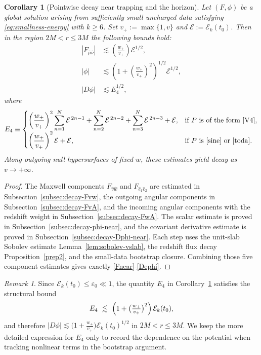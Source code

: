 \documentclass[11pt]{article}
\numberwithin{equation}{section}
\theoremstyle{plain}
\newtheorem{corollary}[theorem]{Corollary}
\theoremstyle{definition}
\theoremstyle{remark}
\newtheorem{remark}{Remark}[section]
\newcommand{\vplus}{v_{+}}
\newcommand{\wplus}{w_{+}}
\begin{document}
\begin{corollary}[Pointwise decay near trapping and the horizon]\label{cor:near-horizon}
Let $(F,\phi)$ be a global solution arising from sufficiently small uncharged data satisfying \eqref{eq:smallness-energy} with $k\ge 6$.
Set $\vplus:=\max\{1,v\}$ and $\mathcal{E}:=\mathcal{E}_k(t_0)$.
Then in the region $2M<r\le 3M$ the following bounds hold:
\begin{eqnarray}
|F_{\hat\mu\hat\nu}|
&\lesssim
\left(\frac{\wplus}{\vplus}\right)\mathcal{E}^{1/2},
\label{Fnear}
\\
|\phi|
&\lesssim
\left(1+\left(\frac{\wplus}{\vplus}\right)^2\right)^{1/2}\mathcal{E}^{1/2},
\label{nearphi}
\\
|D\phi|
&\lesssim
E_4^{1/2},
\label{Dephi}
\end{eqnarray}
where
\begin{equation}
E_4 \equiv
\begin{cases}
\left(\dfrac{\wplus}{\vplus}\right)^{2}\displaystyle\sum_{n=1}^{N}\mathcal{E}^{\,2n-1}
+\displaystyle\sum_{n=2}^{N}\mathcal{E}^{\,2n-2}
+\displaystyle\sum_{n=3}^{N}\mathcal{E}^{\,2n-3}
+\mathcal{E},
& \text{if $P$ is of the form \eqref{V4}},\\[0.8em]
\left(\dfrac{\wplus}{\vplus}\right)^{2}\mathcal{E}
+\mathcal{E},
& \text{if $P$ is \eqref{sine} or \eqref{toda}}.
\end{cases}
\end{equation}
Along outgoing null hypersurfaces of fixed $w$, these estimates yield decay as $v\to+\infty$.
\end{corollary}
\begin{proof}
The Maxwell components $F_{\hat v\hat w}$ and $F_{\hat e_1\hat e_2}$ are estimated in Subsection~\ref{subsec:decay-Fvw}, the outgoing angular components in Subsection~\ref{subsec:decay-FvA}, and the incoming angular components with the redshift weight in Subsection~\ref{subsec:decay-FwA}.  The scalar estimate is proved in Subsection~\ref{subsec:decay-phi-near}, and the covariant derivative estimate is proved in Subsection~\ref{subsec:decay-Dphi-near}.  Each step uses the unit-slab Sobolev estimate Lemma~\ref{lem:sobolev-vslab}, the redshift flux decay Proposition~\ref{prep2}, and the small-data bootstrap closure.  Combining those five component estimates gives exactly \eqref{Fnear}-\eqref{Dephi}.
\end{proof}

\begin{remark}\label{rem:E4-simplify}
Since $\mathcal{E}_k(t_0)\le\varepsilon_0\ll 1$, the quantity $E_4$ in Corollary~\ref{cor:near-horizon} satisfies the structural bound
\begin{equation}
E_4\ \lesssim\ \Bigl(1+\bigl(\tfrac{\wplus}{\vplus}\bigr)^2\Bigr)\,\mathcal{E}_k(t_0),
\end{equation}
and therefore $|D\phi|\lesssim \bigl(1+\tfrac{\wplus}{\vplus}\bigr)\mathcal{E}_k(t_0)^{1/2}$ in $2M<r\le 3M$.
We keep the more detailed expression for $E_4$ only to record the dependence on the potential when tracking nonlinear terms in the bootstrap argument.
\end{remark}
\end{document}

